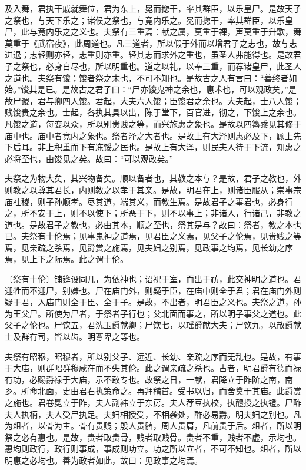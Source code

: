 \documentclass[]{article}
\begin{document}
及入舞，君执干戚就舞位，君为东上，冕而揔干，率其群臣，以乐皇尸。是故天子之祭也，与天下乐之；诸侯之祭也，与竟内乐之。冕而揔干，率其群臣，以乐皇尸，此与竟内乐之之义也。夫祭有三重焉：献之属，莫重于裸，声莫重于升歌，舞莫重于《武宿夜》，此周道也。凡三道者，所以假于外而以增君子之志也，故与志进退；志轻则亦轻，志重则亦重。轻其志而求外之重也，虽圣人弗能得也。是故君子之祭也，必身自尽也，所以明重也。道之以礼，以奉三重，而荐诸皇尸，此圣人之道也。夫祭有馂；馂者祭之末也，不可不知也。是故古之人有言曰：``善终者如始。''馂其是已。是故古之君子曰：``尸亦馂鬼神之余也，惠术也，可以观政矣。''是故尸谡，君与卿四人馂。君起，大夫六人馂；臣馂君之余也。大夫起，士八人馂；贱馂贵之余也。士起，各执其具以出，陈于堂下，百官进，彻之，下馂上之余也。凡馂之道，每变以众，所以别贵贱之等，而兴施惠之象也。是故以四簋黍见其修于庙中也。庙中者竟内之象也。祭者泽之大者也。是故上有大泽则惠必及下，顾上先下后耳。非上积重而下有冻馁之民也。是故上有大泽，则民夫人待于下流，知惠之必将至也，由馂见之矣。故曰：``可以观政矣。''

夫祭之为物大矣，其兴物备矣。顺以备者也，其教之本与？是故，君子之教也，外则教之以尊其君长，内则教之以孝于其亲。是故，明君在上，则诸臣服从；崇事宗庙社稷，则子孙顺孝。尽其道，端其义，而教生焉。是故君子之事君也，必身行之，所不安于上，则不以使下；所恶于下，则不以事上；非诸人，行诸己，非教之道也。是故君子之教也，必由其本，顺之至也，祭其是与？故曰：祭者，教之本也已。夫祭有十伦焉；见事鬼神之道焉，见君臣之义焉，见父子之伦焉，见贵贱之等焉，见亲疏之杀焉，见爵赏之施焉，见夫妇之别焉，见政事之均焉，见长幼之序焉，见上下之际焉。此之谓十伦。

〔祭有十伦〕铺筵设同几，为依神也；诏祝于室，而出于祊，此交神明之道也。君迎牲而不迎尸，别嫌也。尸在庙门外，则疑于臣，在庙中则全于君；君在庙门外则疑于君，入庙门则全于臣、全于子。是故，不出者，明君臣之义也。夫祭之道，孙为王父尸。所使为尸者，于祭者子行也；父北面而事之，所以明子事父之道也。此父子之伦也。尸饮五，君洗玉爵献卿；尸饮七，以瑶爵献大夫；尸饮九，以散爵献士及群有司，皆以齿。明尊卑之等也。

夫祭有昭穆，昭穆者，所以别父子、远近、长幼、亲疏之序而无乱也。是故，有事于大庙，则群昭群穆咸在而不失其伦。此之谓亲疏之杀也。古者，明君爵有德而禄有功，必赐爵禄于大庙，示不敢专也。故祭之日，一献，君降立于阼阶之南，南乡。所命北面，史由君右执策命之。再拜稽首。受书以归，而舍奠于其庙。此爵赏之施也。君卷冕立于阼，夫人副袆立于东房。夫人荐豆执校，执醴授之执镫。尸酢夫人执柄，夫人受尸执足。夫妇相授受，不相袭处，酢必易爵。明夫妇之别也。凡为俎者，以骨为主。骨有贵贱；殷人贵髀，周人贵肩，凡前贵于后。俎者，所以明祭之必有惠也。是故，贵者取贵骨，贱者取贱骨。贵者不重，贱者不虚，示均也。惠均则政行，政行则事成，事成则功立。功之所以立者，不可不知也。俎者，所以明惠之必均也。善为政者如此，故曰：见政事之均焉。
\end{document}
